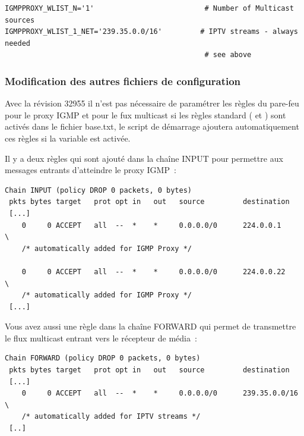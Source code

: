 \begin{description}
\begin{example}
\begin{verbatim}
IGMPPROXY_WLIST_N='1'                          # Number of Multicast sources
IGMPPROXY_WLIST_1_NET='239.35.0.0/16'         # IPTV streams - always needed
                                               # see above
\end{verbatim}
\end{example}

\end{description}

\subsubsection{Modification des autres fichiers de configuration}

Avec la révision 32955 il n'est pas nécessaire de paramétrer les règles du pare-feu
pour le proxy IGMP et pour le fux multicast si les règles standard
( et )
sont activés dans le fichier base.txt, le script de démarrage ajoutera automatiquement
ces règles si la variable  est activée.

Il y a deux règles qui sont ajouté dans la chaîne INPUT pour permettre aux messages
entrants d'atteindre le proxy IGMP~:

\begin{example}
\begin{verbatim}
Chain INPUT (policy DROP 0 packets, 0 bytes)
 pkts bytes target   prot opt in   out   source         destination
 [...]
    0     0 ACCEPT   all  --  *    *     0.0.0.0/0      224.0.0.1     \
    /* automatically added for IGMP Proxy */

    0     0 ACCEPT   all  --  *    *     0.0.0.0/0      224.0.0.22    \
    /* automatically added for IGMP Proxy */
 [...]
\end{verbatim}
\end{example}

Vous avez aussi une règle dans la chaîne FORWARD qui permet de transmettre le flux
multicast entrant vers le récepteur de média~:

\begin{example}
\begin{verbatim}
Chain FORWARD (policy DROP 0 packets, 0 bytes)
 pkts bytes target   prot opt in   out   source         destination         
 [...]
    0     0 ACCEPT   all  --  *    *     0.0.0.0/0      239.35.0.0/16  \
    /* automatically added for IPTV streams */
 [..]
\end{verbatim}
\end{example}

